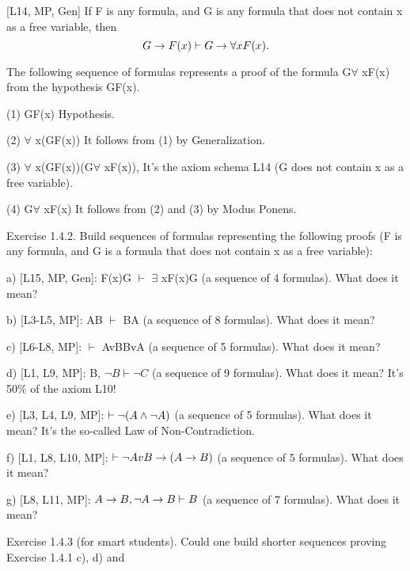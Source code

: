 \begin{theorem}
[L14, MP, Gen] If F is any formula, and G is any formula that does not contain x as a free
variable, then
\[G\rightarrow F(x) \vdash G\rightarrow \forall xF(x).\]
\end{theorem}

The following sequence of formulas represents a proof of the formula G\IMPLIES \(\forall\) xF(x) from the hypothesis
G\IMPLIES F(x).

(1) G\IMPLIES F(x) Hypothesis.

(2) \(\forall\) x(G\IMPLIES F(x)) It follows from (1) by Generalization.

(3) \(\forall\) x(G\IMPLIES F(x))\IMPLIES (G\IMPLIES \(\forall\) xF(x)), It's the axiom schema L14 (G does not contain x as a free variable).

(4) G\IMPLIES \(\forall\) xF(x) It follows from (2) and (3) by Modus Ponens.

\begin{exercise}
Exercise 1.4.2. Build sequences of formulas representing the following proofs (F is any formula, and G is a formula that does not contain x as a free variable):

a) [L15, MP, Gen]: F(x)\IMPLIES G \(\vdash\) \(\exists\) xF(x)\IMPLIES G (a sequence of 4 formulas). What does it mean?

b) [L3-L5, MP]: A\AND B \(\vdash\) B\AND A (a sequence of 8 formulas). What does it mean?

c) [L6-L8, MP]: \(\vdash\) AvB\IMPLIES BvA (a sequence of 5 formulas). What does it mean?

d) [L1, L9, MP]: B, \(\neg B \vdash \neg C\) (a sequence of 9 formulas). What does it mean? It's 50\% of the axiom L10!

e) [L3, L4, L9, MP]: \(\vdash \neg (A\wedge \neg A)\) (a sequence of 5 formulas). What does it mean? It's the so-called Law of Non-Contradiction.

f) [L1, L8, L10, MP]: \(\vdash \neg AvB\rightarrow (A\rightarrow B)\) (a sequence of 5 formulas). What does it mean?

g) [L8, L11, MP]: \(A\rightarrow B, \neg A\rightarrow B \vdash B\) (a sequence of 7 formulas). What does it mean?
\end{exercise}

\begin{exercise}
Exercise 1.4.3 (for smart students). Could one build shorter sequences proving Exercise 1.4.1 c), d) and
\end{exercise}

